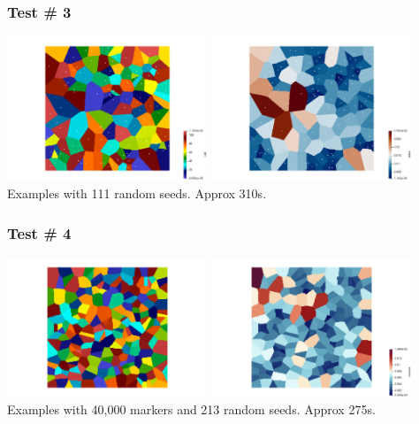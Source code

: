 \subsubsection*{Test \# 3}

\begin{center}
\includegraphics[width=6cm]{python_codes/fieldstone_125/results/test3}
\includegraphics[width=6cm]{python_codes/fieldstone_125/results/test3_area}\\
{\captionfont Examples with 111 random seeds. Approx 310s.}
\end{center}

\subsubsection*{Test \# 4}

\begin{center}
\includegraphics[width=6cm]{python_codes/fieldstone_125/results/test4a}
\includegraphics[width=6cm]{python_codes/fieldstone_125/results/test4b}\\
{\captionfont Examples with 40,000 markers and 213 random seeds. Approx 275s. }
\end{center}

